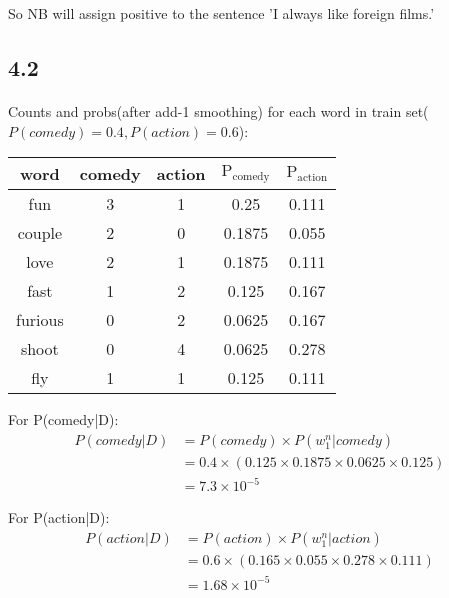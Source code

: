 \documentclass{article}
\begin{document}
So NB will assign positive to the sentence 'I always like foreign films.'


\subsection*{4.2}

\paragraph*{}
Counts and probs(after add-1 smoothing) for each word in train set($P(comedy) = 0.4, P(action) = 0.6$):

\begin{center}
    \begin{tabular}{c c c c c}
        word    & comedy & action & $\textrm{P}_\textrm{comedy}$ & $\textrm{P}_\textrm{action}$
        \\ \hline
        fun     & 3      & 1      & 0.25                         & 0.111
        \\ \hline
        couple  & 2      & 0      & 0.1875                       & 0.055
        \\ \hline
        love    & 2      & 1      & 0.1875                       & 0.111
        \\ \hline
        fast    & 1      & 2      & 0.125                        & 0.167
        \\ \hline
        furious & 0      & 2      & 0.0625                       & 0.167
        \\ \hline
        shoot   & 0      & 4      & 0.0625                       & 0.278
        \\ \hline
        fly     & 1      & 1      & 0.125                        & 0.111
    \end{tabular}
\end{center}

For P(comedy|D):
\begin{align*}
    P(comedy|D) & = P(comedy) \times P(w_1^n|comedy)                            \\
                & = 0.4 \times (0.125 \times 0.1875 \times 0.0625 \times 0.125) \\
                & = 7.3 \times 10^{-5}
\end{align*}

For P(action|D):
\begin{align*}
    P(action|D) & = P(action) \times P(w_1^n|action)                          \\
                & = 0.6 \times (0.165 \times 0.055 \times 0.278 \times 0.111) \\
                & = 1.68 \times 10^{-5}
\end{align*}
\end{document}
